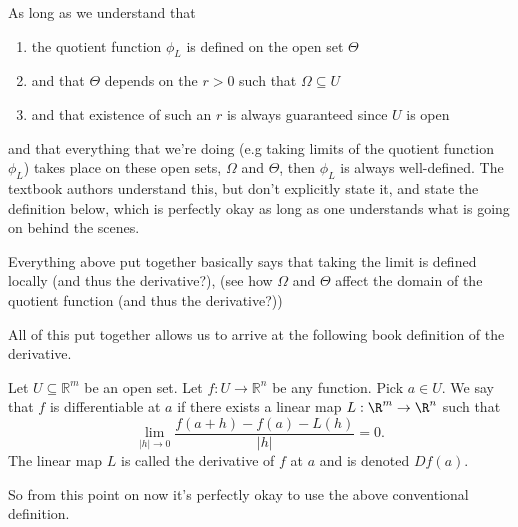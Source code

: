 		\begin{point}
			As long as we understand that 
			
			\begin{enumerate}
				\item the quotient function $\phi_L$ is defined on the open set $\Theta$
				\item  and that $\Theta$ depends on the $r > 0$ such that $\Omega \subseteq U$
				\item  and that existence of such an $r$ is always guaranteed since $U$ is open 
			\end{enumerate}
			and that everything that we're doing (e.g taking limits of the quotient function $\phi_L$) takes place on these open sets, $\Omega$ and $\Theta$, then $\phi_L$ is always well-defined. The textbook authors understand this, but don't explicitly state it, and state the definition below, which is perfectly okay as long as one understands what is going on behind the scenes.
		\end{point}
		
		\begin{point}
			Everything above put together basically says that taking the limit is defined locally (and thus the derivative?), (see how $\Omega$ and $\Theta$ affect the domain of the quotient function (and thus the derivative?))
		\end{point}
		
			
		
		
		All of this put together allows us to arrive at the following book definition of the derivative.
		
		
		\begin{definition}
			Let $U \subseteq \mathbb{R}^m$ be an open set. Let $f : U \to \mathbb{R}^n$ be any function. Pick $a \in U$. We say that $f$ is differentiable at $a$ if there exists a linear map $L : \R^m \to \R^n$ such that $$\lim_{|h| \to 0}\frac{f(a+h)-f(a)-L(h)}{|h|}=0.$$ The linear map $L$ is called the derivative of $f$ at $a$ and is denoted $Df(a)$.
		\end{definition}
		
		So from this point on now it's perfectly okay to use the above conventional definition.
		